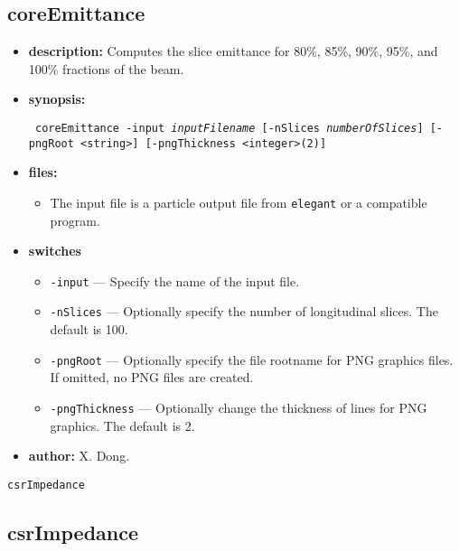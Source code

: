 \documentclass[11pt]{article}
\begin{document}
\subsection{coreEmittance}

\begin{itemize}
\item {\bf description:} Computes the slice emittance for 80\%, 85\%, 90\%, 95\%, and 100\% fractions of the beam.

\item {\bf synopsis:}
\begin{flushleft}{\tt 
coreEmittance -input {\em inputFilename} [-nSlices {\em numberOfSlices}] [-pngRoot <string>] [-pngThickness <integer>(2)]
}
\end{flushleft}

\item {\bf files:}
\begin{itemize}
\item The input file is a particle output file from {\tt elegant} or a compatible program.
\end{itemize}

\item {\bf switches}
\begin{itemize}
\item \verb|-input| --- Specify the name of the input file.
\item \verb|-nSlices| --- Optionally specify the number of longitudinal slices. The default is 100.
\item \verb|-pngRoot| --- Optionally specify the file rootname for PNG graphics files. If omitted, no PNG files are created.
\item \verb|-pngThickness| --- Optionally change the thickness of lines for PNG graphics.  The default is 2.
\end{itemize}

\item {\bf author:} X. Dong.

\end{itemize}

\newpage
\begin{center}{\Large\verb|csrImpedance|}\end{center}
\subsection{csrImpedance}
\end{document}
